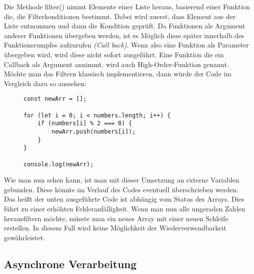 \noindent
Die Methode filter() nimmt Elemente einer Liste heraus, basierend einer Funktion die, die Filterkonditionen bestimmt. Dabei wird zuerst, dass Element aus der Liste entnommen und dann die Kondition geprüft. Da Funktionen als Argument anderer Funktionen übergeben werden, ist es Möglich diese \glqq{}später\grqq{} innerhalb des Funktionsrumpfes aufzurufen \textit{(Call back)}. Wenn also eine Funktion als Parameter übergeben wird, wird diese nicht sofort ausgeführt. Eine Funktion die ein Callback als Argument annimmt, wird auch High-Order-Funktion genannt.\cite{callbacks-example} Möchte man das Filtern klassisch implementieren, dann würde der Code im Vergleich dazu so aussehen:

\begin{figure}[H]
\begin{lstlisting}[basicstyle=\small]
const newArr = [];

for (let i = 0; i < numbers.length; i++) {
    if (numbers[i] % 2 === 0) {
        newArr.push(numbers[i]);
    }
}

console.log(newArr);
\end{lstlisting}
\end{figure}

\noindent
Wie man nun sehen kann, ist man mit dieser Umsetzung an externe Variablen gebunden. Diese könnte im Verlauf des Codes eventuell überschrieben werden. Das heißt der unten ausgeführte Code ist abhängig vom Status des Arrays. Dies führt zu einer erhöhten Fehleranfälligkeit. Wenn man nun alle ungeraden Zahlen herausfiltern möchte, müsste man ein neues Array mit einer neuen Schleife erstellen. In diesem Fall wird keine Möglichkeit der Wiederverwendbarkeit gewährleistet.

\subsection{Asynchrone Verarbeitung}


